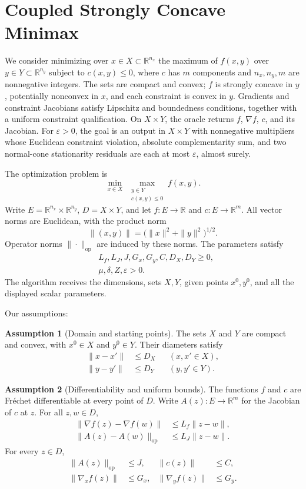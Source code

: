 \documentclass[10pt]{article}
\theoremstyle{definition}
\newtheorem{assumption}{Assumption}
\begin{document}
\section*{Coupled Strongly Concave Minimax}
We consider minimizing over $x\in X\subset\mathbb{R}^{n_x}$ the maximum of $f(x,y)$ over $y\in Y\subset\mathbb{R}^{n_y}$ subject to $c(x,y)\leq0$, where $c$ has $m$ components and $n_x,n_y,m$ are nonnegative integers. The sets are compact and convex; $f$ is strongly concave in $y$, potentially nonconvex in $x$, and each constraint is convex in $y$. Gradients and constraint Jacobians satisfy Lipschitz and boundedness conditions, together with a uniform constraint qualification. On $X\times Y$, the oracle returns $f$, $\nabla f$, $c$, and its Jacobian. For $\varepsilon>0$, the goal is an output in $X\times Y$ with nonnegative multipliers whose Euclidean constraint violation, absolute complementarity sum, and two normal-cone stationarity residuals are each at most $\varepsilon$, almost surely.

The optimization problem is
\[
\min_{x\in X}\ \max_{\substack{y\in Y\\c(x,y)\leq0}} f(x,y).
\]
Write $E=\mathbb{R}^{n_x}\times\mathbb{R}^{n_y}$, $D=X\times Y$, and let $f:E\to\mathbb{R}$ and $c:E\to\mathbb{R}^{m}$. All vector norms are Euclidean, with the product norm
\[
\|(x,y)\|=\bigl(\|x\|^2+\|y\|^2\bigr)^{1/2}.
\]
Operator norms $\|\cdot\|_{\mathrm{op}}$ are induced by these norms. The parameters satisfy
\[
\begin{aligned}
&L_f,L_J,J,G_x,G_y,C,D_X,D_Y\geq0,\\
&\mu,\delta,Z,\varepsilon>0.
\end{aligned}
\]
The algorithm receives the dimensions, sets $X,Y$, given points $x^0,y^0$, and all the displayed scalar parameters.

Our assumptions:
\begin{assumption}[Domain and starting points]
The sets $X$ and $Y$ are compact and convex, with $x^0\in X$ and $y^0\in Y$. Their diameters satisfy
\[
\begin{aligned}
\|x-x'\|&\leq D_X &&(x,x'\in X),\\
\|y-y'\|&\leq D_Y &&(y,y'\in Y).
\end{aligned}
\]
\end{assumption}

\begin{assumption}[Differentiability and uniform bounds]
The functions $f$ and $c$ are Fr\'echet differentiable at every point of $D$. Write $A(z):E\to\mathbb{R}^{m}$ for the Jacobian of $c$ at $z$. For all $z,w\in D$,
\[
\begin{aligned}
\|\nabla f(z)-\nabla f(w)\|&\leq L_f\|z-w\|,\\
\|A(z)-A(w)\|_{\mathrm{op}}&\leq L_J\|z-w\|.
\end{aligned}
\]
For every $z\in D$,
\[
\begin{aligned}
\|A(z)\|_{\mathrm{op}}&\leq J,& \|c(z)\|&\leq C,\\
\|\nabla_x f(z)\|&\leq G_x,& \|\nabla_y f(z)\|&\leq G_y.
\end{aligned}
\]
\end{assumption}
\end{document}
